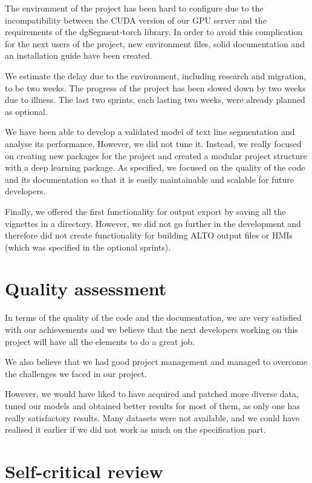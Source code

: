 \documentclass{polytech/polytech}
\numberwithin{figure}{chapter}
\begin{document}

The environment of the project has been hard to configure due to the incompatibility between the CUDA version of our GPU server and the requirements of the dgSegment-torch library.
In order to avoid this complication for the next users of the project, new environment files, solid documentation and an installation guide have been created.

We estimate the delay due to the environment, including research and migration, to be two weeks.
The progress of the project has been slowed down by two weeks due to illness.
The last two sprints, each lasting two weeks, were already planned as optional.

We have been able to develop a validated model of text line segmentation and analyse its performance.
However, we did not tune it.
Instead, we really focused on creating new packages for the project and created a modular project structure with a deep learning package.
As specified, we focused on the quality of the code and its documentation so that it is easily maintainable and scalable for future developers.

Finally, we offered the first functionality for output export by saving all the vignettes in a directory.
However, we did not go further in the development and therefore did not create functionality for building ALTO output files or HMIs (which was specified in the optional sprints).

\section{Quality assessment}

In terms of the quality of the code and the documentation, we are very satisfied with our achievements and we believe that the next developers working on this project will have all the elements to do a great job.

We also believe that we had good project management and managed to overcome the challenges we faced in our project.

However, we would have liked to have acquired and patched more diverse data, tuned our models and obtained better results for most of them, as only one has really satisfactory results.
Many datasets were not available, and we could have realised it earlier if we did not work as much on the specification part.

\section{Self-critical review}
\end{document}
